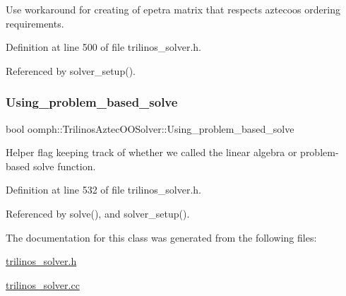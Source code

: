 Use workaround for creating of epetra matrix that respects aztecoo\textquotesingle{}s ordering requirements. 



Definition at line 500 of file trilinos\+\_\+solver.\+h.



Referenced by solver\+\_\+setup().

\mbox{\label{classoomph_1_1TrilinosAztecOOSolver_a015ad0b4207515558d270ef08a213125}} 
\subsubsection{\texorpdfstring{Using\+\_\+problem\+\_\+based\+\_\+solve}{Using\_problem\_based\_solve}}
{\footnotesize\ttfamily bool oomph\+::\+Trilinos\+Aztec\+O\+O\+Solver\+::\+Using\+\_\+problem\+\_\+based\+\_\+solve\hspace{0.3cm}{\ttfamily [protected]}}



Helper flag keeping track of whether we called the linear algebra or problem-\/based solve function. 



Definition at line 532 of file trilinos\+\_\+solver.\+h.



Referenced by solve(), and solver\+\_\+setup().



The documentation for this class was generated from the following files\+:\begin{DoxyCompactItemize}
\item 
\hyperlink{trilinos__solver_8h}{trilinos\+\_\+solver.\+h}\item 
\hyperlink{trilinos__solver_8cc}{trilinos\+\_\+solver.\+cc}\end{DoxyCompactItemize}
